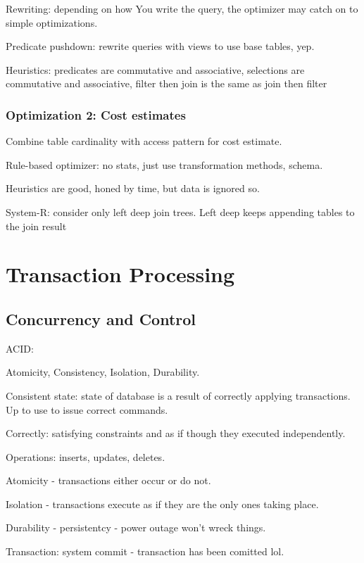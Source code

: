 \documentclass{article}
\begin{document}
			Rewriting: depending on how You write the query, the optimizer may catch on to simple optimizations.
			
			Predicate pushdown: rewrite queries with views to use base tables, yep.
			
			Heuristics: predicates are commutative and associative, selections are commutative and associative, filter then join is the same as join then filter
			
		\subsubsection{Optimization 2: Cost estimates}
		
			Combine table cardinality with access pattern for cost estimate.
			
			Rule-based optimizer: no stats, just use transformation methods, schema.
			
			Heuristics are good, honed by time, but data is ignored so.
			
			System-R: consider only left deep join trees. Left deep keeps appending tables to the join result
			
\section{Transaction Processing}

	

	\subsection{Concurrency and Control}
	
		ACID:
		
		Atomicity, Consistency, Isolation, Durability.
		
		Consistent state: state of database is a result of correctly applying transactions. Up to use to issue correct commands.
		
		Correctly: satisfying constraints and as if though they executed independently.
		
		Operations: inserts, updates, deletes.
		
		Atomicity - transactions either occur or do not.
			
		Isolation - transactions execute as if they are the only ones taking place.
			
		Durability - persistentcy - power outage won't wreck things.
		
		Transaction: system commit - transaction has been comitted lol.
		
\end{document}
